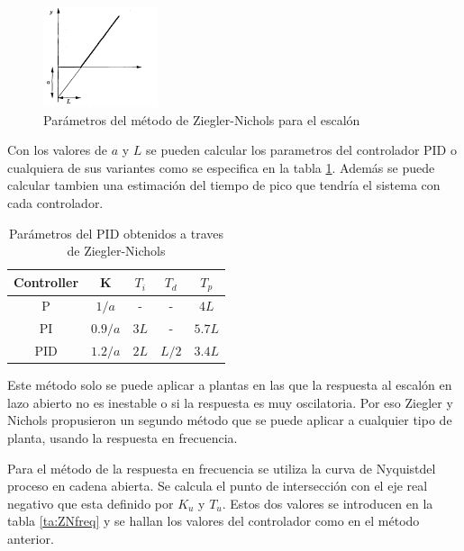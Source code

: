 \documentclass{book}
\begin{document}
\begin{figure}[h!]
\centering
\includegraphics[width=0.3\textwidth]{ZNstep.PNG}
\caption{Par\'ametros del m\'etodo de Ziegler-Nichols para el escal\'on \cite{PIDbook}}
\label{ZNstep}
\end{figure}\par

Con los valores de $a$ y $L$ se pueden calcular los parametros del controlador PID o cualquiera de sus variantes como se especifica en la tabla \ref{ta:ZNstep}. Adem\'as se puede calcular tambien una estimaci\'on del tiempo de pico que tendr\'ia el sistema con cada controlador. \par 

\begin{table}[h!]
\centering
\caption{Par\'ametros del PID obtenidos a traves de Ziegler-Nichols \cite{PIDbook}}
\label{ta:ZNstep}
\begin{tabular}{c|cccc}
Controller & K     & $T_{i}$ & $T_{d}$ & $T_{p}$ \\ \hline
P          & $1/a$   & -        & -        & $4L$       \\
PI         & $0.9/a$ & $3L$       & -        & $5.7L$     \\
PID        & $1.2/a$ & $2L$       & $L/2$      & $3.4L$    
\end{tabular}
\end{table}

Este m\'etodo solo se puede aplicar a plantas en las que la respuesta al escal\'on en lazo abierto no es inestable o si la respuesta es muy oscilatoria. Por eso Ziegler y Nichols propusieron un segundo m\'etodo que se puede aplicar a cualquier tipo de planta, usando la respuesta en frecuencia. \par

Para el m\'etodo de la respuesta en frecuencia se utiliza la curva de Nyquistdel proceso en cadena abierta. Se calcula el punto de intersecci\'on con el eje real negativo que esta definido por $K_{u}$ y $T_{u}$. Estos dos valores se introducen en la tabla \ref{ta:ZNfreq} y se hallan los valores del controlador como en el m\'etodo anterior. \par
\end{document}
